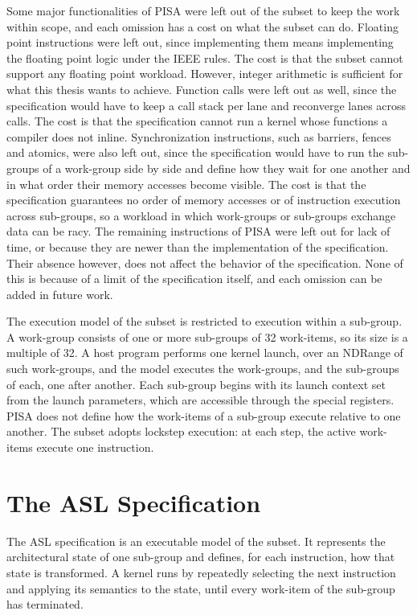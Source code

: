 Some major functionalities of PISA were left out of the subset to keep the
work within scope, and each omission has a cost on what the subset can do.
Floating point instructions were left out, since implementing them means
implementing the floating point logic under the IEEE rules. The cost is
that the subset cannot support any floating point workload. However, integer
arithmetic is sufficient for what this thesis wants to achieve. Function
calls were left out as well, since the specification would have to keep a call
stack per lane and reconverge lanes across calls. The cost is that the
specification cannot run a kernel whose functions a
compiler does not inline. Synchronization instructions, such as barriers, fences and atomics, were also
left out, since the specification would have to run the sub-groups of a
work-group side by side and define how they wait for one another and in
what order their memory accesses become visible. The cost is that the
specification guarantees no order of memory accesses or of instruction
execution across sub-groups, so a workload in which work-groups or
sub-groups exchange data can be racy. The remaining instructions of PISA
were left out for lack of time, or because they are newer than the
implementation of the specification. Their absence however, does not affect the
behavior of the specification. None of this is because of a limit of the specification itself,
and each omission can be added in future work.

The execution model of the subset is restricted to execution within a
sub-group. A work-group consists of one or more sub-groups of 32
work-items, so its size is a multiple of 32. A host program performs one
kernel launch, over an NDRange of such work-groups, and the model executes
the work-groups, and the sub-groups of each, one after another. Each
sub-group begins with its launch context set from the launch parameters,
which are accessible through the special registers. PISA does not define
how the work-items of a sub-group execute relative to one another. The
subset adopts lockstep execution: at each step, the active work-items
execute one instruction.


\section{The ASL Specification}
\label{sec:asl-spec}

The ASL specification is an executable model of the subset. It represents
the architectural state of one sub-group and defines, for each
instruction, how that state is transformed. A kernel runs by repeatedly
selecting the next instruction and applying its semantics to the state,
until every work-item of the sub-group has terminated.

